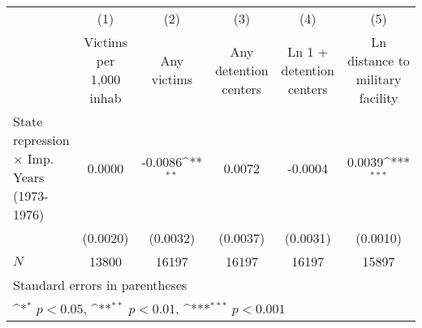 {
\def\sym#1{\ifmmode^{#1}\else\(^{#1}\)\fi}
\begin{tabular}{l*{5}{c}}
\hline\hline
            &\multicolumn{1}{c}{(1)}&\multicolumn{1}{c}{(2)}&\multicolumn{1}{c}{(3)}&\multicolumn{1}{c}{(4)}&\multicolumn{1}{c}{(5)}\\
            &\multicolumn{1}{c}{Victims per 1,000 inhab}&\multicolumn{1}{c}{Any victims}&\multicolumn{1}{c}{Any detention centers}&\multicolumn{1}{c}{Ln 1 + detention centers}&\multicolumn{1}{c}{Ln distance to military facility}\\
\hline
State repression $\times$ Imp. Years (1973-1976)&      0.0000         &     -0.0086\sym{**} &      0.0072         &     -0.0004         &      0.0039\sym{***}\\
            &    (0.0020)         &    (0.0032)         &    (0.0037)         &    (0.0031)         &    (0.0010)         \\
\hline
\(N\)       &       13800         &       16197         &       16197         &       16197         &       15897         \\
\hline\hline
\multicolumn{6}{l}{\footnotesize Standard errors in parentheses}\\
\multicolumn{6}{l}{\footnotesize \sym{*} \(p<0.05\), \sym{**} \(p<0.01\), \sym{***} \(p<0.001\)}\\
\end{tabular}
}
